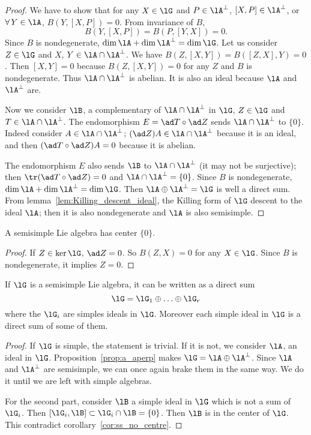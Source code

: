\begin{proof}
	We have to show that for any $X\in\lG$ and $P\in\lA^{\perp}$, $[X,P]\in\lA^{\perp}$, or $\forall\, Y\in\lA$, $B(Y,[X,P])=0$. From invariance of $B$,
	\[
		B(Y,[X,P])=B(P,[Y,X])=0.
	\]
	Since $B$ is nondegenerate, $\dim\lA+\dim\lA^{\perp}=\dim\lG$. Let us consider $Z\in\lG$ and $X$, $Y\in\lA\cap\lA^{\perp}$. We have $B(Z,[X,Y])=B([Z,X],Y)=0$. Then $[X,Y]=0$ because $B(Z,[X,Y])=0$ for any $Z$ and $B$ is nondegenerate. Thus $\lA\cap\lA^{\perp}$ is abelian. It is also an ideal because $\lA$ and $\lA^{\perp}$ are.

	Now we consider $\lB$, a complementary of $\lA\cap\lA^{\perp}$ in $\lG$, $Z\in\lG$ and $T\in\lA\cap\lA^{\perp}$. The endomorphism $E=\ad T\circ\ad Z$ sends $\lA\cap\lA^{\perp}$ to $\{0\}$. Indeed consider $A\in\lA\cap\lA^{\perp}$; $(\ad Z) A\in\lA\cap\lA^{\perp}$ because it is an ideal, and then $(\ad T\circ\ad Z)A=0$ because it is abelian.

	The endomorphism $E$ also sends $\lB$ to $\lA\cap\lA^{\perp}$ (it may not be surjective); then $\tr(\ad T\circ\ad Z)=0$ and $\lA\cap\lA^{\perp}=\{0\}$. Since $B$ is nondegenerate, $\dim\lA+\dim\lA^{\perp}=\dim\lG$. Then $\lA\oplus\lA^{\perp}=\lG$ is well a direct sum.
	From lemma~\ref{lem:Killing_descent_ideal}, the Killing form of $\lG$ descent to the ideal $\lA$; then it is also nondegenerate and $\lA$ is also semisimple.
\end{proof}

\begin{corollary}
	A semisimple Lie algebra has center $\{0\}$.
	\label{cor:ss_no_centre}
\end{corollary}

\begin{proof}
	If $Z\in\ker\lG$, $\ad Z=0$. So $B(Z,X)=0$ for any $X\in\lG$. Since $B$ is nondegenerate, it implies $Z=0$.
\end{proof}


\begin{corollary}
	If $\lG$ is a semisimple Lie algebra, it can be written as a direct sum
	\[
		\lG=\lG_1\oplus\ldots\oplus\lG_r
	\]
	where the $\lG_i$ are simples ideals in $\lG$. Moreover each simple ideal in $\lG$ is a direct sum of some of them.
	\label{cor:decomp_ideal}
\end{corollary}

\begin{proof}
	If $\lG$ is simple, the statement is trivial. If it is not, we consider $\lA$, an ideal in $\lG$.
	Proposition~\ref{prop:a_aperp} makes $\lG=\lA\oplus\lA^{\perp}$. Since $\lA$ and $\lA^{\perp}$ are semisimple, we can once again brake them in the same way. We do it until we are left with simple algebras.

	For the second part, consider $\lB$ a simple ideal in $\lG$ which is not a sum of $\lG_i$. Then $[\lG_i,\lB]\subset\lG_i\cap\lB=\{0\}$. Then $\lB$ is in the center of $\lG$. This contradict corollary~\ref{cor:ss_no_centre}.
\end{proof}

